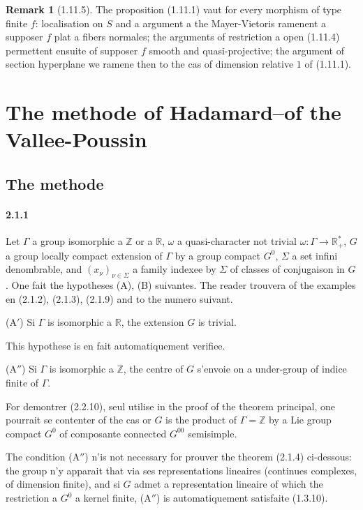 \documentclass[12pt,a4paper]{article}
\theoremstyle{plain}
\theoremstyle{definition}
\newtheorem{remark}[theorem]{Remark}
\theoremstyle{remark}
\newcommand{\RR}{{\mathbb{R}}}
\newcommand{\ZZ}{{\mathbb{Z}}}
\begin{document}
\begin{remark}[1.11.5]
The proposition (1.11.1) vaut for every morphism of type finite $f$: localisation on $S$ and a argument a the Mayer-Vietoris ramenent a supposer $f$ plat a fibers normales; the arguments of restriction a open (1.11.4) permettent ensuite of supposer $f$ smooth and quasi-projective; the argument of section hyperplane we ramene then to the cas of dimension relative $1$ of (1.11.1).
\end{remark}


\newpage
\section{The methode of Hadamard--of the Vallee-Poussin}

\subsection{The methode}

\paragraph{2.1.1}
Let $\Gamma$ a group isomorphic a $\ZZ$ or a $\RR$, $\omega$ a quasi-character not trivial $\omega : \Gamma \to \RR_{+}^*$, $G$ a group locally compact extension of $\Gamma$ by a group compact $G^0$, $\Sigma$ a set infini denombrable, and $(x_\nu)_{\nu \in \Sigma}$ a family indexee by $\Sigma$ of classes of conjugaison in $G$. One fait the hypotheses (A), (B) suivantes. The reader trouvera of the examples en (2.1.2), (2.1.3), (2.1.9) and to the numero suivant.

(A$'$) Si $\Gamma$ is isomorphic a $\RR$, the extension $G$ is trivial.

This hypothese is en fait automatiquement verifiee.

(A$''$) Si $\Gamma$ is isomorphic a $\ZZ$, the centre of $G$ s'envoie on a under-group of indice finite of $\Gamma$.

For demontrer (2.2.10), seul utilise in the proof of the theorem principal, one pourrait se contenter of the cas or $G$ is the product of $\Gamma = \ZZ$ by a Lie group compact $G^0$ of composante connected $G^{00}$ semisimple.

The condition (A$''$) n'is not necessary for prouver the theorem (2.1.4) ci-dessous: the group n'y apparait that via ses representations lineaires (continues complexes, of dimension finite), and si $G$ admet a representation lineaire of which the restriction a $G^0$ a kernel finite, (A$''$) is automatiquement satisfaite (1.3.10).
\end{document}
